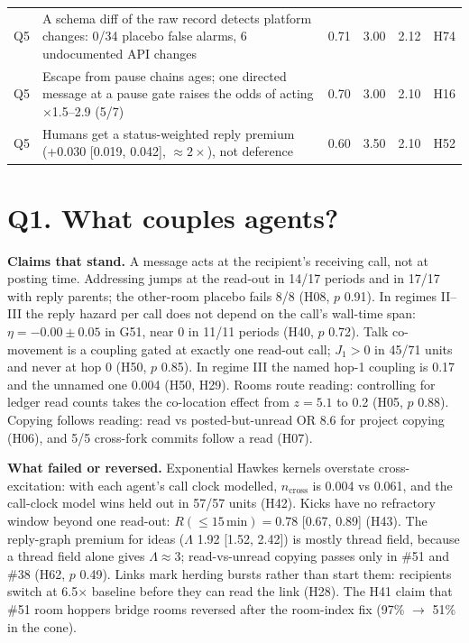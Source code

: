\documentclass[aps,pre,reprint,10pt,nofootinbib]{revtex4-2}
\begin{document}
\begin{table}[t]
\begin{ruledtabular}
\begin{tabular}{lp{11.8cm}cccl}
Q5 & A schema diff of the raw record detects platform changes: 0/34 placebo false alarms, 6 undocumented API changes & 0.71 & 3.00 & 2.12 & H74 \\
Q5 & Escape from pause chains ages; one directed message at a pause gate raises the odds of acting $\times$1.5--2.9 (5/7) & 0.70 & 3.00 & 2.10 & H16 \\
Q5 & Humans get a status-weighted reply premium (+0.030 [0.019, 0.042], $\approx2\times$), not deference & 0.60 & 3.50 & 2.10 & H52 \\
\end{tabular}
\end{ruledtabular}
\end{table}

\section{Q1. What couples agents?}
\textbf{Claims that stand.} A message acts at the recipient's receiving call, not at posting time. Addressing jumps at the read-out in 14/17 periods and in 17/17 with reply parents; the other-room placebo fails 8/8 (H08, $p$ 0.91). In regimes II--III the reply hazard per call does not depend on the call's wall-time span: $\eta=-0.00\pm0.05$ in G51, near 0 in 11/11 periods (H40, $p$ 0.72). Talk co-movement is a coupling gated at exactly one read-out call; $J_1>0$ in 45/71 units and never at hop 0 (H50, $p$ 0.85). In regime III the named hop-1 coupling is 0.17 and the unnamed one 0.004 (H50, H29). Rooms route reading: controlling for ledger read counts takes the co-location effect from $z=5.1$ to 0.2 (H05, $p$ 0.88). Copying follows reading: read vs posted-but-unread OR 8.6 for project copying (H06), and 5/5 cross-fork commits follow a read (H07).

\textbf{What failed or reversed.} Exponential Hawkes kernels overstate cross-excitation: with each agent's call clock modelled, $n_\mathrm{cross}$ is 0.004 vs 0.061, and the call-clock model wins held out in 57/57 units (H42). Kicks have no refractory window beyond one read-out: $R(\le15\,\text{min})=0.78$ [0.67, 0.89] (H43). The reply-graph premium for ideas ($\Lambda$ 1.92 [1.52, 2.42]) is mostly thread field, because a thread field alone gives $\Lambda\approx3$; read-vs-unread copying passes only in \#51 and \#38 (H62, $p$ 0.49). Links mark herding bursts rather than start them: recipients switch at 6.5$\times$ baseline before they can read the link (H28). The H41 claim that \#51 room hoppers bridge rooms reversed after the room-index fix (97\% $\to$ 51\% in the cone).
\end{document}
